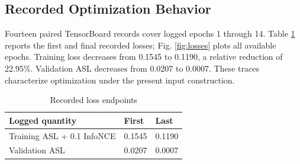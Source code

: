 \documentclass[conference,letterpaper]{IEEEtran}
\begin{document}
\subsection{Recorded Optimization Behavior}

Fourteen paired TensorBoard records cover logged epochs 1 through 14. Table \ref{tab:losses} reports the first and final recorded losses; Fig. \ref{fig:losses} plots all available epochs. Training loss decreases from 0.1545 to 0.1190, a relative reduction of 22.95\%. Validation ASL decreases from 0.0207 to 0.0007. These traces characterize optimization under the present input construction.

\begin{table}[t]\caption{Recorded loss endpoints}\label{tab:losses}\centering\footnotesize\begin{tabular}{@{}p{}p{}p{}@{}}\toprule Logged quantity & First & Last\\\midrule Training ASL + 0.1 InfoNCE & 0.1545 & 0.1190\\Validation ASL & 0.0207 & 0.0007\\\bottomrule\end{tabular}\end{table}
\end{document}
